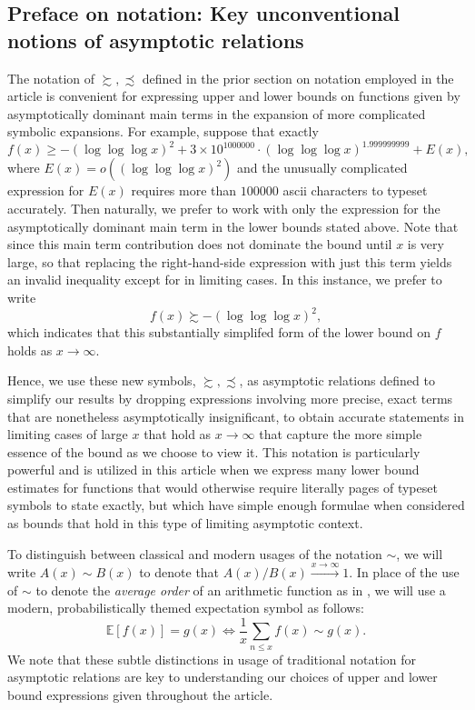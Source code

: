 \documentclass[11pt,reqno,a4letter]{article}
\numberwithin{figure}{section}
\numberwithin{table}{section}
\theoremstyle{plain}
\numberwithin{theorem}{section}
\theoremstyle{definition}
\begin{document}
\subsection{Preface on notation: Key unconventional notions of asymptotic relations} 

The notation of $\succsim,\precsim$ defined in the prior section on notation employed in the article is 
convenient for expressing upper and lower bounds on functions given by asymptotically dominant 
main terms in the expansion of more complicated symbolic expansions. 
For example, suppose that exactly
\[
f(x) \geq -(\log\log\log x)^2 + 3 \times 10^{1000000} \cdot (\log\log\log x)^{1.999999999} + E(x), 
\]
where $E(x) = o\left((\log\log\log x)^2\right)$ and the unusually complicated expression for $E(x)$ requires 
more than $100000$ ascii characters to typeset accurately. Then naturally, we prefer to work with only the expression
for the asymptotically dominant main term in the lower bounds stated above. Note that since this main term contribution 
does not dominate the bound until $x$ is very large, so that replacing the right-hand-side expression with just this 
term yields an invalid inequality except for in limiting cases. In this instance, we prefer to write 
\[
f(x) \succsim -(\log\log\log x)^2, 
\]
which indicates that this substantially simplifed form of the lower bound on $f$ holds as $x \rightarrow \infty$. 

Hence, we use these new symbols, $\succsim,\precsim$, as asymptotic 
relations defined to simplify our results by dropping expressions involving more precise, exact terms 
that are nonetheless asymptotically insignificant, to obtain accurate statements 
in limiting cases of large $x$ that hold as $x \rightarrow \infty$ that capture the more simple 
essence of the bound as we choose to view it. This notation is particularly 
powerful and is utilized in this article when we express many lower bound estimates for functions that would 
otherwise require literally pages of typeset symbols to state exactly, but which have simple enough 
formulae when considered as bounds that hold in this type of limiting asymptotic context. 

To distinguish between classical and modern usages of the notation $\sim$, we will write 
$A(x) \sim B(x)$ to denote that $A(x) / B(x) \xrightarrow{x \rightarrow \infty} 1$. In place of the use of 
$\sim$ to denote the \emph{average order} of an arithmetic function as in \cite{HARDYWRIGHT}, we will use a modern, 
probabilistically themed expectation symbol as follows: 
\[
\mathbb{E}[f(x)] = g(x) \iff \frac{1}{x} \sum_{n \leq x} f(x) \sim g(x). 
\]
We note that these subtle distinctions in usage of traditional notation for asymptotic relations are key to 
understanding our choices of upper and lower bound expressions given throughout the article. 
\end{document}
